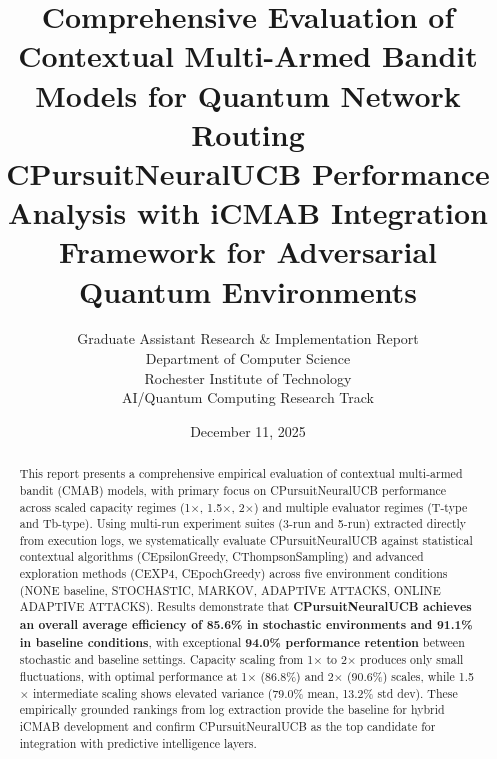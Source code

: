 \documentclass[12pt,a4paper]{article}
\title{\textbf{Comprehensive Evaluation of Contextual Multi-Armed Bandit Models for Quantum Network Routing}\\
\large{CPursuitNeuralUCB Performance Analysis with iCMAB Integration Framework for Adversarial Quantum Environments}}
\author{Graduate Assistant Research \& Implementation Report\\ 
Department of Computer Science \\ 
Rochester Institute of Technology \\ 
AI/Quantum Computing Research Track}
\date{December 11, 2025}
\newcommand{\performance}[1]{\textcolor{performancecolor}{\textbf{#1}}}
\newcommand{\success}[1]{\textcolor{successcolor}{\textbf{#1}}}
\begin{document}
\maketitle

\begin{abstract}
This report presents a comprehensive empirical evaluation of contextual multi-armed bandit (CMAB) models, with primary focus on CPursuitNeuralUCB performance across scaled capacity regimes (1$\times$, 1.5$\times$, 2$\times$) and multiple evaluator regimes (T-type and Tb-type). Using multi-run experiment suites (3-run and 5-run) extracted directly from execution logs, we systematically evaluate CPursuitNeuralUCB against statistical contextual algorithms (CEpsilonGreedy, CThompsonSampling) and advanced exploration methods (CEXP4, CEpochGreedy) across five environment conditions (NONE baseline, STOCHASTIC, MARKOV, ADAPTIVE ATTACKS, ONLINE ADAPTIVE ATTACKS). Results demonstrate that \performance{CPursuitNeuralUCB achieves an overall average efficiency of 85.6\% in stochastic environments and 91.1\% in baseline conditions}, with exceptional \success{94.0\% performance retention} between stochastic and baseline settings. Capacity scaling from 1$\times$ to 2$\times$ produces only small fluctuations, with optimal performance at 1$\times$ (86.8\%) and 2$\times$ (90.6\%) scales, while 1.5$\times$ intermediate scaling shows elevated variance (79.0\% mean, 13.2\% std dev). These empirically grounded rankings from log extraction provide the baseline for hybrid iCMAB development and confirm CPursuitNeuralUCB as the top candidate for integration with predictive intelligence layers.
\end{abstract}

\newpage
{\tableofcontents}

\newpage
\end{document}
